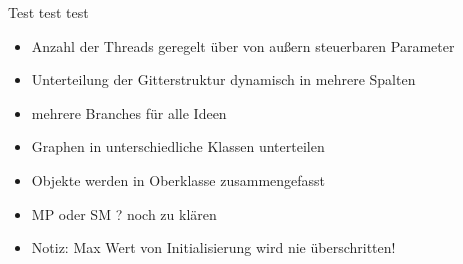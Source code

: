 
\usepackage{pdfpages}
\usepackage{listings}



\newcommand{\subtitle}{\textbf{Milestone 1}}
\newcommand{\StudNameOne}{Jens Heinen (2542182)}
\newcommand{\StudNameTwo}{Lukas Schaal (2539218)}
\newcommand{\StudNameThree}{Christoph Rosenhauer (2549220)}

\newcommand{\ndt}{Nichtdeterminismus }
Test test test

\begin{itemize}
	\item Anzahl der Threads geregelt über von außern steuerbaren Parameter
	\item Unterteilung der Gitterstruktur dynamisch in mehrere Spalten
	\item mehrere Branches für alle Ideen
	\item Graphen in unterschiedliche Klassen unterteilen
	\item Objekte werden in Oberklasse zusammengefasst 
	\item MP oder SM ? noch zu klären
	\item Notiz: Max Wert von Initialisierung wird nie überschritten!
\end{itemize}

%


